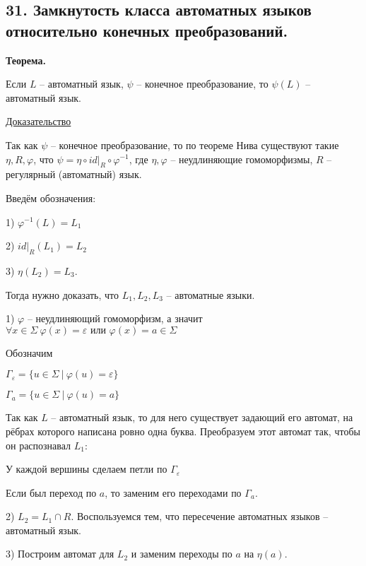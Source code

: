 \subsection{31. Замкнутость класса автоматных языков относительно конечных преобразований.}

\newcommand{\idR}{\left. id \right|_{R}}

\textbf{Теорема. }

Если $L$ -- автоматный язык, $\psi$ -- конечное преобразование, то
$\psi(L)$ -- автоматный язык.

\underline{Доказательство}

Так как $\psi$ -- конечное преобразование, то по теореме Нива
существуют такие $\eta, R, \varphi$, что 
$\psi = \eta \circ \idR \circ \varphi^{-1}$, 
где $\eta, \varphi$ -- неудлиняющие гомоморфизмы,
$R$ -- регулярный (автоматный) язык.

Введём обозначения:

1) $\varphi^{-1} (L) = L_1$

2) $\idR (L_1) = L_2$

3) $\eta (L_2) = L_3$.

Тогда нужно доказать, что $L_1, L_2, L_3$ -- автоматные языки.

1) $\varphi$ -- неудлиняющий гомоморфизм, а значит 
$\forall x \in \Sigma \ \varphi(x) = \varepsilon \text{ или } \varphi(x) = a \in \Sigma$

Обозначим 

$\Gamma_{\varepsilon} = \{ u \in \Sigma \ |\ \varphi(u) = \varepsilon \}$

$\Gamma_a = \{ u \in \Sigma \ |\ \varphi(u) = a \}$

Так как $L$ -- автоматный язык, то для него существует задающий его автомат, на рёбрах которого написана ровно одна буква. Преобразуем этот автомат так, чтобы он распознавал $L_1$:

У каждой вершины сделаем петли по $\Gamma_{\varepsilon}$

Если был переход по $a$, то заменим его переходами по $\Gamma_a$.

2) $L_2 = L_1 \cap R$. Воспользуемся тем, что пересечение автоматных языков -- автоматный язык.

3) Построим автомат для $L_2$ и заменим переходы по $a$ на $\eta(a)$.